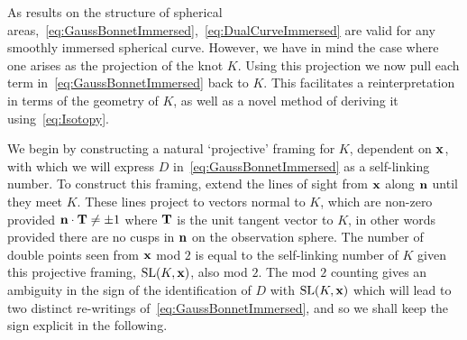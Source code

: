     As results on the structure of spherical areas,~\eqref{eq:GaussBonnetImmersed},~\eqref{eq:DualCurveImmersed} are valid for any smoothly immersed spherical curve. However, we have in mind the case where one arises as the projection of the knot $K$. Using this projection we now pull each term in~\eqref{eq:GaussBonnetImmersed} back to $K$. This facilitates a reinterpretation in terms of the geometry of $K$, as well as a novel method of deriving it using~\eqref{eq:Isotopy}.

    We begin by constructing a natural `projective' framing for $K$, dependent on $\bf x$, with which we will express $D$ in~\eqref{eq:GaussBonnetImmersed} as a self-linking number. To construct this framing, extend the lines of sight from ${\bf x}$ along ${\bf n}$ until they meet $K$. These lines project to vectors normal to $K$, which are non-zero provided ${\bf n} \cdot {\bf T} \neq \pm 1$ where ${\bf T}$ is the unit tangent vector to $K$, in other words provided there are no cusps in ${\bf n}$ on the observation sphere. The number of double points seen from $\bf x$ mod $2$ is equal to the self-linking number of $K$ given this projective framing, $\mathrm{SL}(K,{\bf x})$, also mod $2$. The mod $2$ counting gives an ambiguity in the sign of the identification of $D$ with $\mathrm{SL}(K,{\bf x})$ which will lead to two distinct re-writings of~\eqref{eq:GaussBonnetImmersed}, and so we shall keep the sign explicit in the following. 

